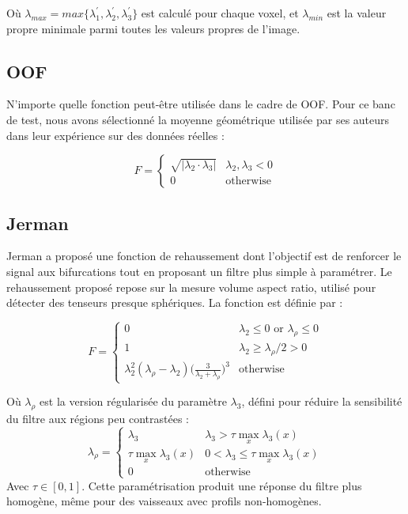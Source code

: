 Où $\lambda_{max} = max\{\lambda_{1}^{'},\lambda_{2}^{'},\lambda_{3}^{'}\}$ est calculé pour chaque voxel, et $\lambda_{min}$ est la valeur propre minimale parmi toutes les valeurs propres de l'image.

\subsection{OOF}

N'importe quelle fonction peut-être utilisée dans le cadre de OOF. Pour ce banc de test, nous avons sélectionné la moyenne géométrique utilisée par ses auteurs dans leur expérience sur des données réelles :

\begin{equation}
\nonumber
    F =
    \left\{
    \begin{array}{lr}
    
    \sqrt{|\lambda_2 \cdot \lambda_3|}   & \lambda_2, \lambda_3 < 0 \\
    0     & \textrm{otherwise}
    \end{array}
    \right.
\end{equation}

\subsection{Jerman}

Jerman \etal a proposé une fonction de rehaussement dont l'objectif est de renforcer le signal aux bifurcations tout en proposant un filtre plus simple à paramétrer. Le rehaussement proposé repose sur la mesure volume aspect ratio, utilisé pour détecter des tenseurs presque sphériques. La fonction est définie par :

\begin{equation}
\nonumber
  F =
\left\{
  \begin{array}{lr}
    0 & \lambda_2 \leqslant 0 \textrm{~or~} \lambda_\rho \leqslant 0 \\
    1 & \lambda_2 \geqslant \lambda_\rho / 2 > 0 \\
    \lambda_2^2(\lambda_\rho -\lambda_2)\big(\frac{3}{\lambda_2+\lambda_\rho}\big)^3 & \textrm{otherwise}
  \end{array}
  \right. 
\end{equation}

Où $\lambda_\rho$ est la version régularisée du paramètre $\lambda_3$, défini pour réduire la sensibilité du filtre aux régions peu contrastées :
\begin{equation}
\nonumber
  \lambda_\rho =
  \left\{
  \begin{array}{lr}
     \lambda_3  & \lambda_3 > \tau \max_{x} \lambda_3(x) \\
    \tau \max_{x} \lambda_3(x) & 0 < \lambda_3 \leqslant \tau \max_{x} \lambda_3(x) \\
    0  & \textrm{otherwise}
  \end{array}
\right.
\end{equation}
Avec $\tau \in [0,1]$. Cette paramétrisation produit une réponse du filtre plus homogène, même pour des vaisseaux avec profils non-homogènes.

